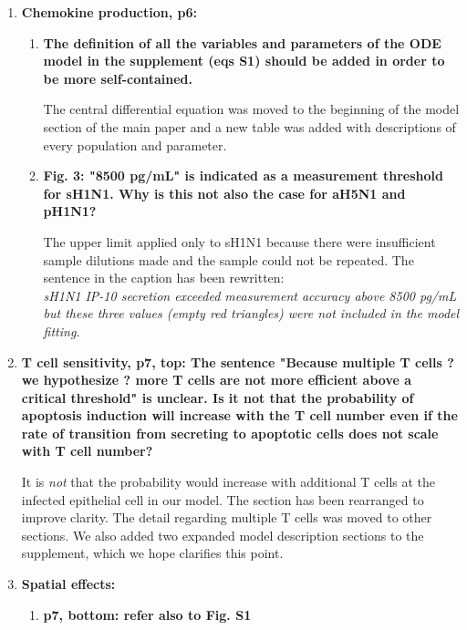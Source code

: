 \documentclass[10pt]{article}
\begin{document}
\begin{enumerate}
\item \textbf{Chemokine production, p6:}

\begin{enumerate}
	\item \textbf{The definition of all the variables and parameters of the ODE model in the supplement (eqs S1) should be added in order to be more self-contained.} 
	
The central differential equation was moved to the beginning of the model section of the main paper and a new table was added with descriptions of every population and parameter. \\

	\item \textbf{Fig. 3: "8500 pg/mL" is indicated as a measurement threshold for sH1N1.  Why is this not also the case for aH5N1 and pH1N1?} 
	
The upper limit applied only to sH1N1 because there were insufficient sample dilutions made and the sample could not be repeated.  The sentence in the caption has been rewritten: \\

\textit{sH1N1 IP-10 secretion exceeded measurement accuracy above 8500 pg/mL but these three values (empty red triangles) were not included in the model fitting.} \\

\end{enumerate}

\pagebreak

\item \textbf{T cell sensitivity, p7, top: The sentence "Because multiple T cells ? we hypothesize ? more T cells are not more efficient above a critical threshold" is unclear. Is it not that the probability of apoptosis induction will increase with the T cell number even if the rate of transition from secreting to apoptotic cells does not scale with T cell number?}

It is {\em not} that the probability would increase with additional T cells at the infected epithelial cell in our model.  The section has been rearranged to improve clarity. The detail regarding multiple T cells was moved to other sections.  We also added two expanded model description sections to the supplement, which we hope clarifies this point. \\


\item \textbf{Spatial effects:}
\begin{enumerate}
	\item \textbf{p7, bottom: refer also to Fig. S1}
	

\end{enumerate}
\end{enumerate}
\end{document}
